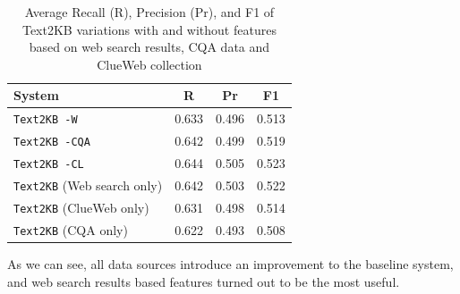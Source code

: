 \begin{table}
\caption{Average Recall (R), Precision (Pr), and F1 of Text2KB variations with and without features based on web search results, CQA data and ClueWeb collection}
\label{table:ablation:features}
\centering
\begin{tabular}{| p{4cm} | c | c | c | }
\hline
System & R & Pr &  F1 \\
\hline
\texttt{Text2KB -W} & 0.633 & 0.496 & 0.513 \\
\texttt{Text2KB -CQA} & 0.642 & 0.499 & 0.519 \\
\texttt{Text2KB -CL} & 0.644 & 0.505 & 0.523 \\
\hline
\texttt{Text2KB} (Web search only) & 0.642 & 0.503 & 0.522 \\
\texttt{Text2KB} (ClueWeb only) & 0.631 & 0.498 & 0.514 \\
\texttt{Text2KB} (CQA only) & 0.622 & 0.493 & 0.508 \\
\hline
\end{tabular}
\end{table}

As we can see, all data sources introduce an improvement to the baseline system, and web search results based features turned out to be the most useful.


